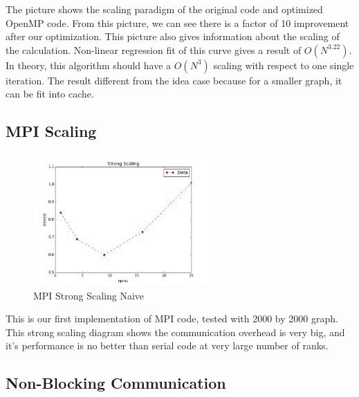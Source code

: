 The picture shows the scaling paradigm of the original code and optimized OpenMP code. From this picture, we can
see there is a factor of 10 improvement after our optimization. This picture also gives information about the
scaling of the calculation. Non-linear regression fit of this curve gives a result of $O(N^{3.22})$. \\

In theory, this algorithm should have a $O(N^{3})$ scaling with respect to one single iteration. The result
different from the idea case because for a smaller graph, it can be fit into cache.

\subsection{MPI Scaling}

\begin{figure}[H]
    \centering
    \includegraphics[width=0.6\textwidth]{figs/MPI_strong_scaling.png}
    \caption{MPI Strong Scaling Naive}
\end{figure}

This is our first implementation of MPI code, tested with 2000 by 2000 graph. This strong scaling diagram shows the communication
overhead is very big, and it's performance is no better than serial code at very large number of ranks. 

\subsection{Non-Blocking Communication}

